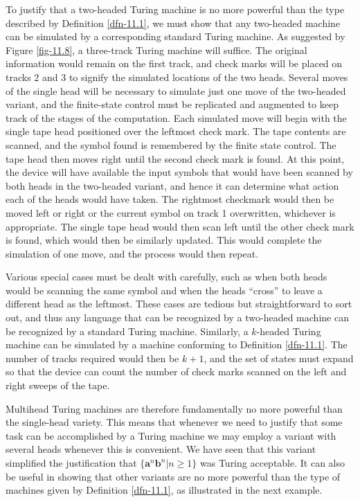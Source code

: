 To justify that a two-headed Turing machine is no more powerful than the type
described by Definition \ref{dfn-11.1}, we must show that any two-headed machine can be
simulated by a corresponding standard Turing machine. As suggested by Figure
\ref{fig-11.8}, a three-track Turing machine will suffice. The original information would
remain on the first track, and check marks will be placed on tracks 2 and 3 to
signify the simulated locations of the two heads. Several moves of the single
head will be necessary to simulate just one move of the two-headed variant, and
the finite-state control must be replicated and augmented to keep track of the
stages of the computation. Each simulated move will begin with the single tape
head positioned over the leftmost check mark. The tape contents are scanned, and
the symbol found is remembered by the finite state control. The tape head then
moves right until the second check mark is found. At this point, the device will
have available the input symbols that would have been scanned by both heads in
the two-headed variant, and hence it can determine what action each of the heads
would have taken. The rightmost checkmark would then be moved left or right or
the current symbol on track 1 overwritten, whichever is appropriate. The single
tape head would then scan left until the other check mark is found, which would
then be similarly updated. This would complete the simulation of one move, and
the process would then repeat.

Various special cases must be dealt with carefully, such as when both heads
would be scanning the same symbol and when the heads ``cross'' to leave a
different head as the leftmost. These cases are tedious but straightforward to
sort out, and thus any language that can be recognized by a two-headed machine
can be recognized by a standard Turing machine. Similarly, a $k$-headed Turing
machine can be simulated by a machine conforming to Definition \ref{dfn-11.1}. The number
of tracks required would then be $k+1$, and the set of states must expand so
that the device can count the number of check marks scanned on the left and
right sweeps of the tape.

Multihead Turing machines are therefore fundamentally no more powerful than the
single-head variety. This means that whenever we need to justify that some task
can be accomplished by a Turing machine we may employ a variant with several
heads whenever this is convenient. We have seen that this variant simplified the
justification that $\{\pmb{a}^n\pmb{b}^n|n\geq 1\}$ was Turing acceptable. It
can also be useful in showing that other variants are no more powerful than the
type of machines given by Definition \ref{dfn-11.1}, as illustrated in the next example.

